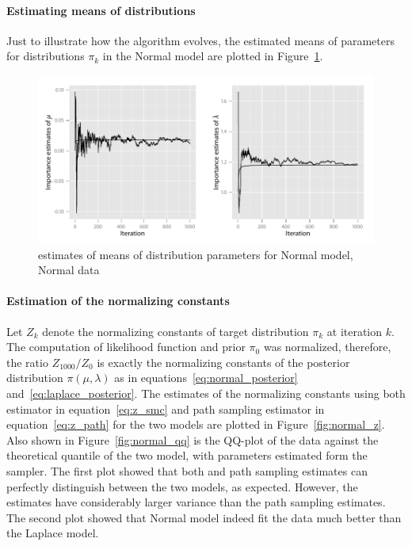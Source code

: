 \paragraph{Estimating means of distributions} Just to illustrate how the \smc
algorithm evolves, the estimated means of parameters for distributions $\pi_k$
in the Normal model are plotted in Figure~\ref{fig:normal_dist_mean}.

\begin{figure}[htb]
  \centering
  \includegraphics{fig/5-ndm}
  \caption{\smc estimates of means of distribution parameters for Normal
    model, Normal data}
  \label{fig:normal_dist_mean}
\end{figure}

\paragraph{Estimation of the normalizing constants} Let $Z_k$ denote the
normalizing constants of target distribution $\pi_k$ at iteration $k$. The
computation of likelihood function and prior $\pi_0$ was normalized,
therefore, the ratio $Z_{1000}/Z_0$ is exactly the normalizing constants of
the posterior distribution $\pi(\mu,\lambda)$ as in
equations~\eqref{eq:normal_posterior} and~\eqref{eq:laplace_posterior}. The
estimates of the normalizing constants using both \smc estimator in
equation~\eqref{eq:z_smc} and path sampling estimator in
equation~\eqref{eq:z_path} for the two models are plotted in
Figure~\ref{fig:normal_z}. Also shown in Figure~\ref{fig:normal_qq} is the
QQ-plot of the data against the theoretical quantile of the two model, with
parameters estimated form the \smc sampler. The first plot showed that both
\smc and path sampling estimates can perfectly distinguish between the two
models, as expected. However, the \smc estimates have considerably larger
variance than the path sampling estimates. The second plot showed that Normal
model indeed fit the data much better than the Laplace model.

